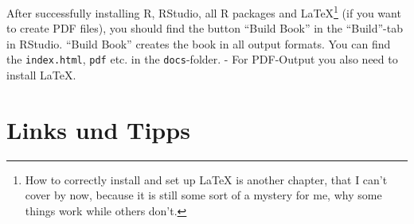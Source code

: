 \documentclass[]{book}
\let\rmarkdownfootnote\footnote%
\def\footnote{\protect\rmarkdownfootnote}
\theoremstyle{definition}
\theoremstyle{definition}
\theoremstyle{remark}
\begin{document}
After successfully installing R, RStudio, all R packages and
LaTeX\footnote{How to correctly install and set up LaTeX is another
  chapter, that I can't cover by now, because it is still some sort of a
  mystery for me, why some things work while others don't.} (if you want
to create PDF files), you should find the button ``Build Book'' in the
``Build''-tab in RStudio. ``Build Book'' creates the book in all output
formats. You can find the \texttt{index.html}, \texttt{pdf} etc. in the
\texttt{docs}-folder. - For PDF-Output you also need to install LaTeX.

\hypertarget{links-und-tipps}{\section*{Links und
Tipps}\label{links-und-tipps}}
\end{document}
